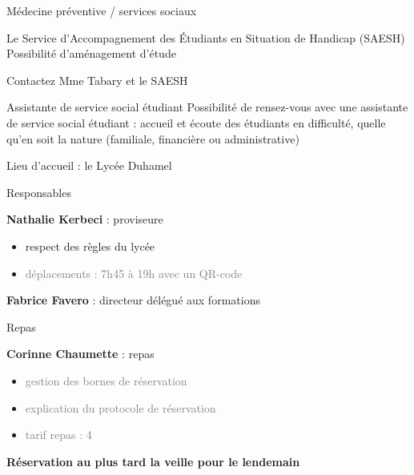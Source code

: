 \documentclass [xcolor=x11names,t] {beamer}
\begin{document}
\begin{frame}{Médecine préventive / services sociaux}
	\begin{block}{Le Service d’Accompagnement des Étudiants en Situation de Handicap (SAESH)}
		Possibilité d'aménagement d’étude
		
		Contactez Mme Tabary et le SAESH
	\end{block}
	
	\begin{block}{Assistante de service social étudiant }
			Possibilité de rensez-vous avec une assistante de service social étudiant : accueil et écoute des étudiants en difficulté, quelle qu'en soit la nature (familiale, financière ou administrative)
		
	\end{block}
		
\end{frame}

%
%


\begin{frame}{Lieu d'accueil : le Lycée Duhamel}
	
	\begin{block}{Responsables}
		
		
		\textbf{Nathalie Kerbeci} : proviseure     
		\begin{itemize}
			\item \textcolor{gray!50!red}{respect des règles du lycée}
			\item \textcolor{gray}{déplacements : 7h45 à 19h avec un QR-code}
			
		\end{itemize}
		
		
		\textbf{Fabrice Favero} : directeur délégué aux formations
		
		
	\end{block}
	
	\begin{alertblock}{Repas}
		
		\textbf{Corinne Chaumette} : repas     
		\begin{itemize}
			\item \textcolor{gray}{gestion des bornes de réservation}
			\item \textcolor{gray}{explication du protocole de réservation}
			\item \textcolor{gray}{tarif repas : 4}
		\end{itemize}
		\textbf{Réservation au plus tard la veille pour le lendemain}
	\end{alertblock}
	
	
	
	
\end{frame}
\end{document}
